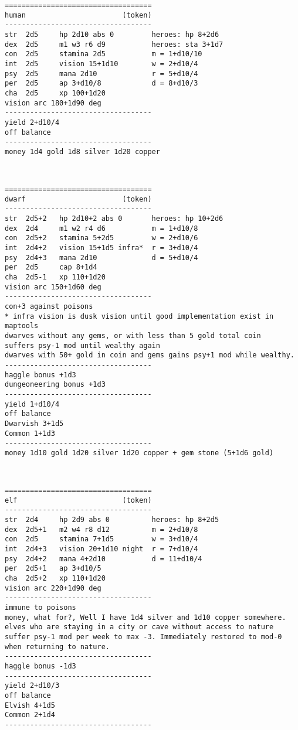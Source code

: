 \small
\goodbreak \begin{samepage} \begin{verbatim}
===================================
human                       (token)
-----------------------------------
str  2d5     hp 2d10 abs 0         heroes: hp 8+2d6
dex  2d5     m1 w3 r6 d9           heroes: sta 3+1d7
con  2d5     stamina 2d5           m = 1+d10/10
int  2d5     vision 15+1d10        w = 2+d10/4
psy  2d5     mana 2d10             r = 5+d10/4
per  2d5     ap 3+d10/8            d = 8+d10/3
cha  2d5     xp 100+1d20
vision arc 180+1d90 deg
-----------------------------------
yield 2+d10/4
off balance
-----------------------------------
money 1d4 gold 1d8 silver 1d20 copper
\end{verbatim} \end{samepage}

\

\goodbreak \begin{samepage} \begin{verbatim}
===================================
dwarf                       (token)
-----------------------------------
str  2d5+2   hp 2d10+2 abs 0       heroes: hp 10+2d6
dex  2d4     m1 w2 r4 d6           m = 1+d10/8
con  2d5+2   stamina 5+2d5         w = 2+d10/6
int  2d4+2   vision 15+1d5 infra*  r = 3+d10/4
psy  2d4+3   mana 2d10             d = 5+d10/4
per  2d5     cap 8+1d4
cha  2d5-1   xp 110+1d20
vision arc 150+1d60 deg
-----------------------------------
con+3 against poisons
* infra vision is dusk vision until good implementation exist in maptools
dwarves without any gems, or with less than 5 gold total coin
suffers psy-1 mod until wealthy again
dwarves with 50+ gold in coin and gems gains psy+1 mod while wealthy.
-----------------------------------
haggle bonus +1d3
dungeoneering bonus +1d3
-----------------------------------
yield 1+d10/4
off balance
Dwarvish 3+1d5
Common 1+1d3
-----------------------------------
money 1d10 gold 1d20 silver 1d20 copper + gem stone (5+1d6 gold)
\end{verbatim} \end{samepage}

\

\goodbreak \begin{samepage} \begin{verbatim}
===================================
elf                         (token)
-----------------------------------
str  2d4     hp 2d9 abs 0          heroes: hp 8+2d5
dex  2d5+1   m2 w4 r8 d12          m = 2+d10/8
con  2d5     stamina 7+1d5         w = 3+d10/4
int  2d4+3   vision 20+1d10 night  r = 7+d10/4
psy  2d4+2   mana 4+2d10           d = 11+d10/4
per  2d5+1   ap 3+d10/5
cha  2d5+2   xp 110+1d20
vision arc 220+1d90 deg
-----------------------------------
immune to poisons
money, what for?, Well I have 1d4 silver and 1d10 copper somewhere.
elves who are staying in a city or cave without access to nature
suffer psy-1 mod per week to max -3. Immediately restored to mod-0
when returning to nature.
-----------------------------------
haggle bonus -1d3
-----------------------------------
yield 2+d10/3
off balance
Elvish 4+1d5
Common 2+1d4
-----------------------------------
\end{verbatim} \end{samepage}

